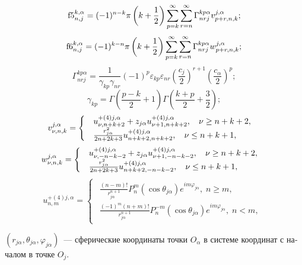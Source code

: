 \begin{russian}
\begin{theorem}
\[{\rm{f5}}_{n,j}^{k,\alpha } = (-1)^{n-k}\pi \left( {k + \frac{1}{2}} \right)\sum\limits_{p = k}^\infty  {\sum\limits_{r = n}^\infty  {\Gamma _{nrj}^{kp\alpha }v_{p + r,n,k}^{j,\alpha }} };\]
\[{\rm{f6}}_{n,j}^{k,\alpha } = (-1)^{k-n}\pi \left( {k + \frac{1}{2}} \right)\sum\limits_{p = k}^\infty  {\sum\limits_{r = n}^\infty  {\Gamma _{nrj}^{kp\alpha }w_{p + r,n,k}^{j,\alpha }} };\]
\[\Gamma _{nrj}^{kp\alpha } = \frac{1}{{{\gamma _{kp}}{\gamma _{nr}}}}{( - 1)^{p}}{\varepsilon _{kp}}{\varepsilon _{nr}}{\left( {\frac{{{{{c}}_j}}}{2}} \right)^{r + 1}}{\left( {\frac{{{{{c}}_\alpha }}}{2}} \right)^p};\]
\[{\gamma _{kp}} = \Gamma \left( {\frac{{p - k}}{2} + 1} \right)\Gamma \left( {\frac{{k + p}}{2} + \frac{3}{2}} \right);\]
\[v_{\nu ,n,k}^{j,\alpha } = \left\{ {\begin{array}{*{20}{l}}
\begin{array}{l}
u_{\nu ,n + k + 2}^{ + (4)j,\alpha } + {z_{j\alpha }}u_{\nu  + 1,n + k + 2}^{ + (4)j,\alpha },\;\;\;{\kern 1pt} \nu  \ge n + k + 2,\\
\frac{{r_{j\alpha }^2}}{{2n + 2k + 3}}u_{n + k + 2,n + k + 2}^{ + (4)j,\alpha },\;\;\;{\kern 1pt} \nu  \le n + k + 1,
\end{array}
\end{array}} \right.\]
\[w_{\nu ,n,k}^{j,\alpha } = \left\{ {\begin{array}{*{20}{l}}
\begin{array}{l}
u_{\nu , - n - k - 2}^{ + (4)j,\alpha } + {z_{j\alpha }}u_{\nu  + 1, - n - k - 2}^{ + (4)j,\alpha },\;\;\;{\kern 1pt} \nu  \ge n + k + 2,\\
\frac{{r_{j\alpha }^2}}{{2n + 2k + 3}}u_{n + k + 2, - n - k - 2}^{ + (4)j,\alpha },\;\;\;{\kern 1pt} \nu  \le n + k + 1,
\end{array}
\end{array}} \right.\]
\[{{u}}_{n,m}^{ + (4)j,\alpha } = \left\{ {\begin{array}{*{20}{l}}
\begin{array}{l}
\frac{{(n - m)!}}{{r_{j\alpha }^{n + 1}}}P_n^m(\cos {\theta _{j\alpha }}){e^{im{\varphi _{j\alpha }}}},\;n \ge m,\\
\frac{{{{( - 1)}^m}(n + m)!}}{{r_{j\alpha }^{n + 1}}}P_n^{ - m}(\cos {\theta _{j\alpha }}){e^{im{\varphi _{j\alpha }}}},\;n < m,
\end{array}
\end{array}} \right.\]

\noindent $(r_{j\alpha},\theta_{j\alpha},\varphi_{j\alpha})$~--- сферические координаты точки $O_\alpha$ в системе координат с началом в точке $O_j$.
\end{theorem}


\end{russian}
